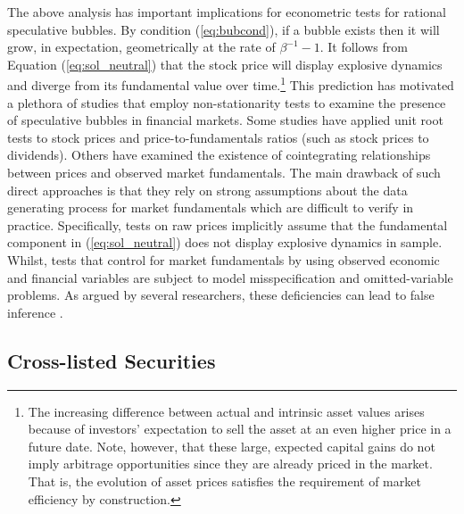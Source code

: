 \documentclass[11pt]{article}
\begin{document}
The above analysis has important implications for econometric tests for rational speculative bubbles. By condition (\ref{eq:bubcond}), if a bubble exists then it will grow, in expectation, geometrically at the rate of $\beta^{-1}-1$. It follows from Equation (\ref{eq:sol_neutral}) that the stock price will display explosive dynamics and diverge from its fundamental value over time.\footnote{The increasing difference between actual and intrinsic asset values arises because of investors' expectation to sell the asset at an even higher price in a future date. Note, however, that these large, expected capital gains do not imply arbitrage opportunities since they are already priced in the market. That is, the evolution of asset prices satisfies the requirement of market efficiency by construction.} This prediction has motivated a plethora of studies that employ non-stationarity tests to examine the presence of speculative bubbles in financial markets. Some studies have applied unit root tests to stock prices and price-to-fundamentals ratios (such as stock prices to dividends). Others have examined the existence of cointegrating relationships between prices and observed market fundamentals. The main drawback of such direct approaches is that they rely on strong assumptions about the data generating process for market fundamentals which are difficult to verify in practice. Specifically, tests on raw prices implicitly assume that the fundamental component in (\ref{eq:sol_neutral}) does not display explosive dynamics in sample. Whilst, tests that control for market fundamentals by using observed economic and financial variables are subject to model misspecification and omitted-variable problems. As argued by several researchers, these deficiencies can lead to false inference \citep{Gurkaynak2008}. 

\subsection{Cross-listed Securities} 
\end{document}
